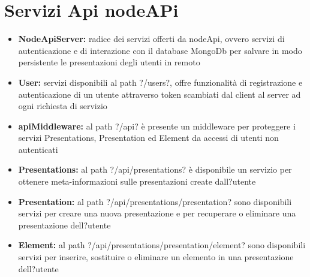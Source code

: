 \section{Servizi Api nodeAPi}{
\begin{itemize}

	\item \textbf{NodeApiServer:} radice dei servizi offerti da nodeApi, ovvero servizi di autenticazione e di interazione con il database MongoDb per salvare in modo persistente le presentazioni degli utenti in remoto
	
	\item \textbf{User:} servizi disponibili al path ?/users?, offre funzionalità di registrazione e autenticazione di un utente attraverso token scambiati dal client al server ad ogni richiesta di servizio

	\item \textbf{apiMiddleware:} al path ?/api? è presente un middleware per proteggere i servizi Presentations, Presentation ed Element da accessi di utenti non autenticati

	\item \textbf{Presentations:} al path ?/api/presentations? è disponibile un servizio per ottenere meta-informazioni sulle presentazioni create dall?utente 

	\item \textbf{Presentation:} al path ?/api/presentations/presentation? sono disponibili servizi per creare una nuova presentazione e per recuperare o eliminare una presentazione dell?utente
	
	\item \textbf{Element:} al path ?/api/presentations/presentation/element? sono disponibili servizi per inserire, sostituire o eliminare un elemento in una presentazione dell?utente
\end{itemize}
}
